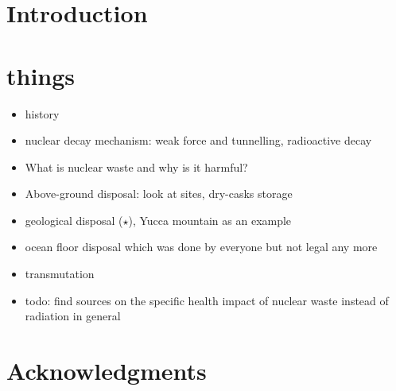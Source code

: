 \documentclass[usenatbib]{article}
\begin{document}
\section{Introduction}

\section{things}
\begin{itemize}
    \item history
    \item nuclear decay mechanism: weak force and tunnelling, radioactive decay
    \item What is nuclear waste and why is it harmful?
    \item Above-ground disposal: look at sites, dry-casks storage
    \item geological disposal ($\star$), Yucca mountain as an example
    \item ocean floor disposal which was done by everyone but not legal any more
    \item transmutation
    \item todo: find sources on the specific health impact of nuclear waste instead of radiation
        in general
\end{itemize}
\section{Acknowledgments}
\nocite{*}
\pagebreak
{}


\end{document}
